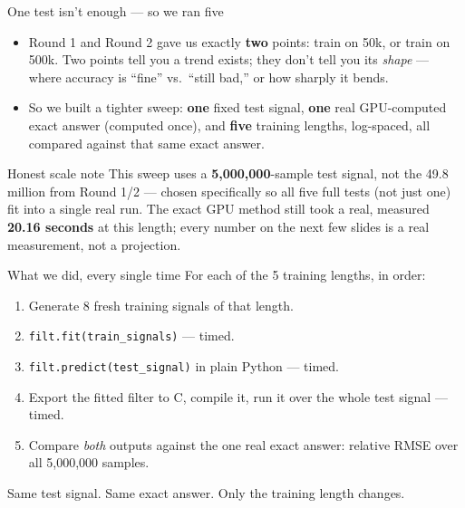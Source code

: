 \documentclass[11pt]{beamer}
\begin{document}
\begin{frame}{One test isn't enough --- so we ran five}
\begin{itemize}
\item Round 1 and Round 2 gave us exactly \textbf{two} points: train on 50k, or train on 500k. Two points tell you a trend exists; they don't tell you its \emph{shape} --- where accuracy is ``fine'' vs.\ ``still bad,'' or how sharply it bends.
\item So we built a tighter sweep: \textbf{one} fixed test signal, \textbf{one} real GPU-computed exact answer (computed once), and \textbf{five} training lengths, log-spaced, all compared against that same exact answer.
\end{itemize}
\begin{alertblock}{Honest scale note}
This sweep uses a \textbf{5,000,000}-sample test signal, not the 49.8 million from Round 1/2 --- chosen specifically so all five full tests (not just one) fit into a single real run. The exact GPU method still took a real, measured \textbf{20.16 seconds} at this length; every number on the next few slides is a real measurement, not a projection.
\end{alertblock}
\end{frame}

\begin{frame}{What we did, every single time}
For each of the 5 training lengths, in order:
\begin{enumerate}
\item Generate 8 fresh training signals of that length.
\item \texttt{filt.fit(train\_signals)} --- timed.
\item \texttt{filt.predict(test\_signal)} in plain Python --- timed.
\item Export the fitted filter to C, compile it, run it over the whole test signal --- timed.
\item Compare \emph{both} outputs against the one real exact answer: relative RMSE over all 5,000,000 samples.
\end{enumerate}
\vspace{0.5em}
\begin{block}{}
\centering Same test signal. Same exact answer. Only the training length changes.
\end{block}
\end{frame}
\end{document}
